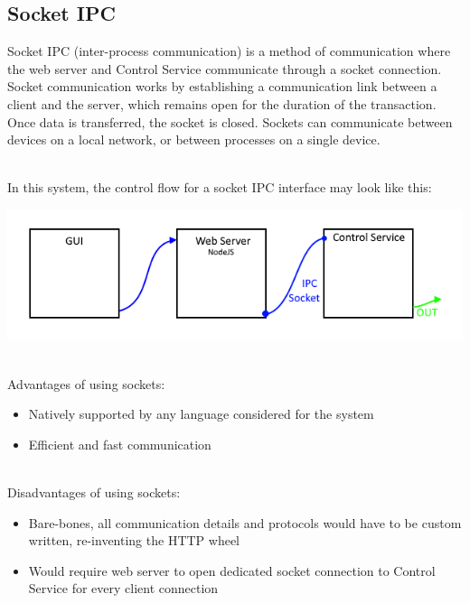 \documentclass[onecolumn, draftclsnofoot,10pt, compsoc]{IEEEtran}
\begin{document}

		\subsection{Socket IPC}
		Socket IPC (inter-process communication) is a method of communication where the web server and Control Service communicate through a socket connection.
		Socket communication works by establishing a communication link between a client and the server, which remains open for the duration of the transaction. \cite{socket1}
		Once data is transferred, the socket is closed. Sockets can communicate between devices on a local network, or between processes on a single device.


		\noindent \\In this system, the control flow for a socket IPC interface may look like this:

		\includegraphics[width=\linewidth]{IPCDiag.png}

		\noindent \\Advantages of using sockets:
		\begin{itemize}
			\item Natively supported by any language considered for the system
			\item Efficient and fast communication
		\end{itemize}

		\noindent \\Disadvantages of using sockets:
		\begin{itemize}
			\item Bare-bones, all communication details and protocols would have to be custom written, re-inventing the HTTP wheel
			\item Would require web server to open dedicated socket connection to Control Service for every client connection
		\end{itemize}
\end{document}
